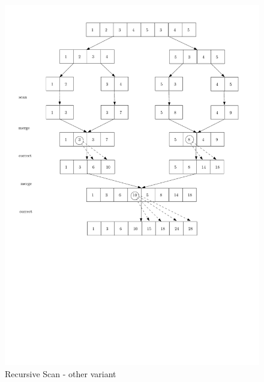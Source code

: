 \documentclass[a4paper,twoside,11pt]{article}
\begin{document}
\begin{figure}[hbtp]
\centering
\label{fig:para_algo}
\includegraphics[scale=.75]{recur3}
\caption{Recursive Scan - other variant}
\end{figure}
\end{document}

